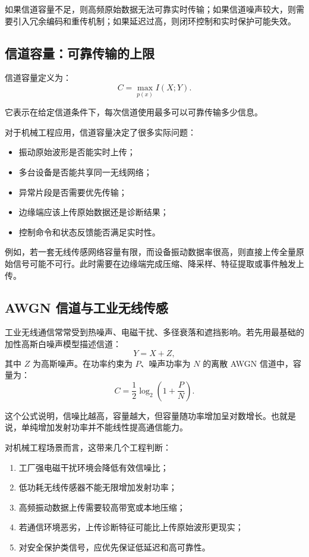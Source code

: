\documentclass[UTF8,a4paper,12pt]{ctexart}
\begin{document}
如果信道容量不足，则高频原始数据无法可靠实时传输；如果信道噪声较大，则需要引入冗余编码和重传机制；如果延迟过高，则闭环控制和实时保护可能失效。

\subsection{信道容量：可靠传输的上限}

信道容量定义为：
\begin{equation}
C=\max_{p(x)} I(X;Y).
\end{equation}

它表示在给定信道条件下，每次信道使用最多可以可靠传输多少信息。

对于机械工程应用，信道容量决定了很多实际问题：
\begin{itemize}
  \item 振动原始波形是否能实时上传；
  \item 多台设备是否能共享同一无线网络；
  \item 异常片段是否需要优先传输；
  \item 边缘端应该上传原始数据还是诊断结果；
  \item 控制命令和状态反馈能否满足实时性。
\end{itemize}

例如，若一套无线传感网络容量有限，而设备振动数据率很高，则直接上传全量原始信号可能不可行。此时需要在边缘端完成压缩、降采样、特征提取或事件触发上传。

\subsection{AWGN 信道与工业无线传感}

工业无线通信常常受到热噪声、电磁干扰、多径衰落和遮挡影响。若先用最基础的加性高斯白噪声模型描述信道：
\begin{equation}
Y=X+Z,
\end{equation}
其中 $Z$ 为高斯噪声。在功率约束为 $P$、噪声功率为 $N$ 的离散 AWGN 信道中，容量为：
\begin{equation}
C=\frac{1}{2}\log_2\left(1+\frac{P}{N}\right).
\end{equation}

这个公式说明，信噪比越高，容量越大，但容量随功率增加呈对数增长。也就是说，单纯增加发射功率并不能线性提高通信能力。

对机械工程场景而言，这带来几个工程判断：
\begin{enumerate}
  \item 工厂强电磁干扰环境会降低有效信噪比；
  \item 低功耗无线传感器不能无限增加发射功率；
  \item 高频振动数据上传需要较高带宽或本地压缩；
  \item 若通信环境恶劣，上传诊断特征可能比上传原始波形更现实；
  \item 对安全保护类信号，应优先保证低延迟和高可靠性。
\end{enumerate}
\end{document}
